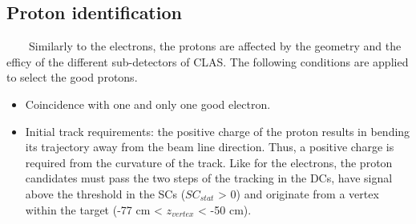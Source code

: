 \subsection{Proton identification}
~~~~Similarly to the electrons, the protons are affected by the geometry and the efficy of the different sub-detectors of CLAS. The following conditions are applied to select the good protons.
\begin{itemize}
\item Coincidence with one and only one good electron.
 
\item Initial track requirements: the positive charge of the proton results in bending its trajectory away from the beam line direction. Thus, a positive charge is required from the curvature of the track. Like for the electrons, the proton candidates must pass the two steps of the tracking in the DCs, have signal above the threshold in the SCs ($SC_{stat}$ > 0) and originate from a vertex within the target (-77 cm < $z_{vertex}$ < -50 cm). 


\end{itemize}
